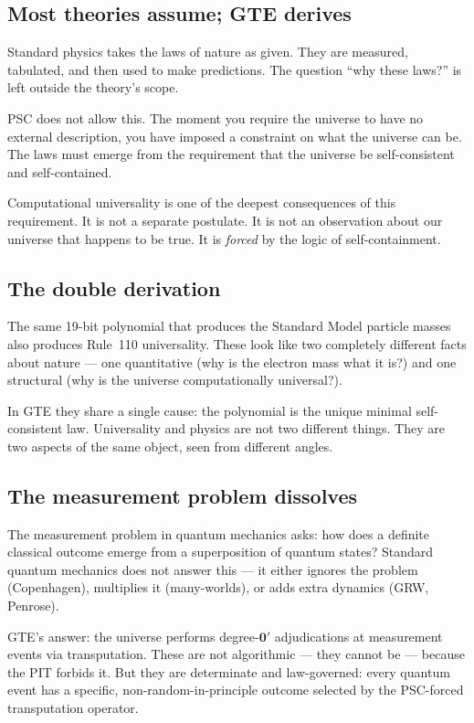 \documentclass[11pt,a4paper]{article}
\begin{document}
\subsection{Most theories assume; GTE derives}

Standard physics takes the laws of nature as given.  They are measured, tabulated,
and then used to make predictions.  The question ``why these laws?'' is left outside
the theory's scope.

PSC does not allow this.  The moment you require the universe to have no external
description, you have imposed a constraint on what the universe can be.  The laws
must emerge from the requirement that the universe be self-consistent and self-contained.

Computational universality is one of the deepest consequences of this requirement.
It is not a separate postulate.  It is not an observation about our universe that
happens to be true.  It is \emph{forced} by the logic of self-containment.

\subsection{The double derivation}

The same 19-bit polynomial that produces the Standard Model particle masses also
produces Rule~110 universality.  These look like two completely different facts about
nature — one quantitative (why is the electron mass what it is?) and one structural
(why is the universe computationally universal?).

In GTE they share a single cause: the polynomial is the unique minimal self-consistent
law.  Universality and physics are not two different things.  They are two aspects
of the same object, seen from different angles.

\subsection{The measurement problem dissolves}

The measurement problem in quantum mechanics asks: how does a definite classical
outcome emerge from a superposition of quantum states?  Standard quantum mechanics
does not answer this — it either ignores the problem (Copenhagen), multiplies it
(many-worlds), or adds extra dynamics (GRW, Penrose).

GTE's answer: the universe performs degree-$\mathbf{0}'$ adjudications at measurement
events via transputation.  These are not algorithmic — they cannot be — because the
PIT forbids it.  But they are determinate and law-governed: every quantum event has
a specific, non-random-in-principle outcome selected by the PSC-forced transputation
operator.
\end{document}
